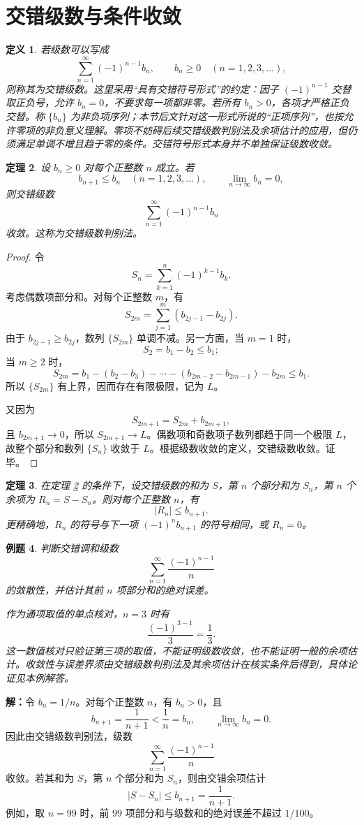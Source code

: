 \documentclass[UTF8,fontset=fandol,11pt]{ctexart}
\newtheorem{definition}{定义}[section]
\newtheorem{theorem}[definition]{定理}
\newtheorem{example}[definition]{例题}
\begin{document}
\section{交错级数与条件收敛}\label{sec:S04}
\begin{definition}
若级数可以写成
\[
\sum_{n=1}^{\infty}(-1)^{n-1}b_n,
\qquad b_n\geq 0\quad(n=1,2,3,\ldots),
\]
则称其为交错级数。这里采用“具有交错符号形式”的约定：因子 $(-1)^{n-1}$ 交替取正负号，允许 $b_n=0$，不要求每一项都非零。若所有 $b_n>0$，各项才严格正负交替。称 $\{b_n\}$ 为非负项序列；本节后文针对这一形式所说的“正项序列”，也按允许零项的非负意义理解。零项不妨碍后续交错级数判别法及余项估计的应用，但仍须满足单调不增且趋于零的条件。交错符号形式本身并不单独保证级数收敛。\label{def:alternating-series}
\end{definition}
\begin{theorem}
设 $b_n\geq0$ 对每个正整数 $n$ 成立。若
\[
b_{n+1}\leq b_n\quad(n=1,2,3,\ldots),
\qquad \lim_{n\to\infty}b_n=0,
\]
则交错级数
\[
\sum_{n=1}^{\infty}(-1)^{n-1}b_n
\]
收敛。这称为交错级数判别法。\label{thm:alternating-test}
\end{theorem}
\begin{proof}
令
\[
S_n=\sum_{k=1}^{n}(-1)^{k-1}b_k.
\]
考虑偶数项部分和。对每个正整数 $m$，有
\[
S_{2m}=\sum_{j=1}^{m}(b_{2j-1}-b_{2j}).
\]
由于 $b_{2j-1}\geq b_{2j}$，数列 $\{S_{2m}\}$ 单调不减。另一方面，当 $m=1$ 时，
\[
S_2=b_1-b_2\leq b_1;
\]
当 $m\geq2$ 时，
\[
S_{2m}=b_1-(b_2-b_3)-\cdots-(b_{2m-2}-b_{2m-1})-b_{2m}\leq b_1.
\]
所以 $\{S_{2m}\}$ 有上界，因而存在有限极限，记为 $L$。

又因为
\[
S_{2m+1}=S_{2m}+b_{2m+1},
\]
且 $b_{2m+1}\to0$，所以 $S_{2m+1}\to L$。偶数项和奇数项子数列都趋于同一个极限 $L$，故整个部分和数列 $\{S_n\}$ 收敛于 $L$。根据级数收敛的定义，交错级数收敛。证毕。
\end{proof}
\begin{theorem}
在定理 \ref{thm:alternating-test} 的条件下，设交错级数的和为 $S$，第 $n$ 个部分和为 $S_n$，第 $n$ 个余项为 $R_n=S-S_n$。则对每个正整数 $n$，有
\[
|R_n|\leq b_{n+1}.
\]
更精确地，$R_n$ 的符号与下一项 $(-1)^n b_{n+1}$ 的符号相同，或 $R_n=0$。\label{thm:alternating-remainder}
\end{theorem}
\begin{example}
判断交错调和级数
\[
\sum_{n=1}^{\infty}\frac{(-1)^{n-1}}{n}
\]
的敛散性，并估计其前 $n$ 项部分和的绝对误差。

作为通项取值的单点核对，$n=3$ 时有
\[
\frac{(-1)^{3-1}}{3}=\frac13.
\]
这一数值核对只验证第三项的取值，不能证明级数收敛，也不能证明一般的余项估计。收敛性与误差界须由交错级数判别法及其余项估计在核实条件后得到，具体论证见本例解答。
\end{example}
\par\noindent\textbf{解：}令 $b_n=1/n$。对每个正整数 $n$，有 $b_n>0$，且
\[
b_{n+1}=\frac{1}{n+1}<\frac1n=b_n,
\qquad \lim_{n\to\infty}b_n=0.
\]
因此由交错级数判别法，级数
\[
\sum_{n=1}^{\infty}\frac{(-1)^{n-1}}{n}
\]
收敛。若其和为 $S$，第 $n$ 个部分和为 $S_n$，则由交错余项估计
\[
|S-S_n|\leq b_{n+1}=\frac{1}{n+1}.
\]
例如，取 $n=99$ 时，前 $99$ 项部分和与级数和的绝对误差不超过 $1/100$。
\end{document}
